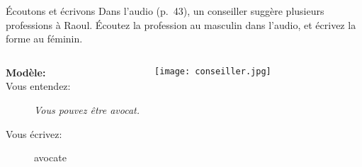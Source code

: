 \begin{frame}{Écoutons et écrivons}
  Dans l'audio (p.~43), un conseiller suggère plusieurs professions à Raoul.
  Écoutez la profession au masculin dans l'audio, et écrivez la forme au féminin.
  \begin{columns}
      \begin{description}
        \item[\textbf{Modèle:}]
        \item[Vous entendez:] \emph{Vous pouvez être avocat.}
        \item[Vous écrivez:] avocat\alert{e}
      \end{description}
      \begin{center}
        \texttt{[image: conseiller.jpg]}
      \end{center}
  \end{columns}
\end{frame}